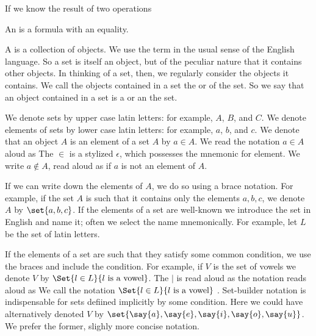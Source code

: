 \sbasic


\sstart



If we know the result of two operations


An  is a formula
with an equality.

A  is a collection of objects.
We use the term  in the
usual sense of the English language.
So a set is itself an object, but of the peculiar nature
that it contains other objects.
In thinking of a set, then, we regularly consider the
objects it contains.
We call the objects contained in a set the
 or
 of the set.
So we say that an object contained in a set is a
 or an
 the set.


We denote sets by upper case latin letters: for example, $A$, $B$, and $C$.
We denote elements of sets by lower case latin letters: for example, $a$, $b$, and $c$.
We denote that an object $A$ is an element of a set $A$ by $a \in A$.
We read the notation $a \in A$ aloud as 
The $\in$ is a stylized $\epsilon$, which possesses the mnemonic for element.
We write $a \not\in A$, read aloud as  if $a$ is not an element of $A$.

If we can write down the elements of $A$, we do so using a brace notation.
For example, if the set $A$ is such that it contains only the elements $a, b, c$, we denote $A$ by $\set{a, b, c}$.
If the elements of a set are well-known we introduce the set in English and name it; often we select the name mnemonically.
For example, let $L$ be the set of latin letters.

If the elements of a set are such that they satisfy some common condition, we use the braces and include the condition.
For example, if $V$ is the set of vowels we denote $V$ by $\Set{l \in L}{l \text{ is a vowel}}$.
The $\mid$ is read aloud as  the notation reads aloud as 
We call the notation $\Set{l \in L}{l \text{ is a vowel}}$ .
Set-builder notation is indispensable for sets defiined implicitly by some condition.
Here we could have alternatively denoted $V$ by $\set{\say{a},\say{e},\say{i},\say{o},\say{u}}$.
We prefer the former, slighly more concise notation.


